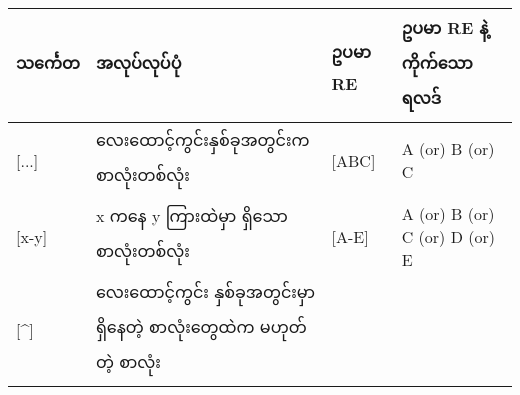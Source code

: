 \documentclass[11pt]{article}
\begin{document}
\begin{longtable}[c]{@{}llll@{}}
\toprule
\begin{minipage}[b]{0.12\columnwidth}\raggedright\strut
သင်္ကေတ
\strut\end{minipage} &
\begin{minipage}[b]{0.15\columnwidth}\raggedright\strut
အလုပ်လုပ်ပုံ
\strut\end{minipage} &
\begin{minipage}[b]{0.12\columnwidth}\raggedright\strut
ဥပမာ RE
\strut\end{minipage} &
\begin{minipage}[b]{0.10\columnwidth}\raggedright\strut
ဥပမာ RE နဲ့ ကိုက်သောရလဒ်
\strut\end{minipage}\tabularnewline
\midrule
\endhead
\begin{minipage}[t]{0.12\columnwidth}\raggedright\strut
{[}...{]}
\strut\end{minipage} &
\begin{minipage}[t]{0.15\columnwidth}\raggedright\strut
လေးထောင့်ကွင်းနှစ်ခုအတွင်းက စာလုံးတစ်လုံး
\strut\end{minipage} &
\begin{minipage}[t]{0.12\columnwidth}\raggedright\strut
{[}ABC{]}
\strut\end{minipage} &
\begin{minipage}[t]{0.10\columnwidth}\raggedright\strut
A (or) B (or) C
\strut\end{minipage}\tabularnewline
\begin{minipage}[t]{0.12\columnwidth}\raggedright\strut
{[}x-y{]}
\strut\end{minipage} &
\begin{minipage}[t]{0.15\columnwidth}\raggedright\strut
x ကနေ y ကြားထဲမှာ ရှိသော စာလုံးတစ်လုံး
\strut\end{minipage} &
\begin{minipage}[t]{0.12\columnwidth}\raggedright\strut
{[}A-E{]}
\strut\end{minipage} &
\begin{minipage}[t]{0.10\columnwidth}\raggedright\strut
A (or) B (or) C (or) D (or) E
\strut\end{minipage}\tabularnewline
\begin{minipage}[t]{0.12\columnwidth}\raggedright\strut
{[}\^{}{]}
\strut\end{minipage} &
\begin{minipage}[t]{0.15\columnwidth}\raggedright\strut
လေးထောင့်ကွင်း နှစ်ခုအတွင်းမှာ ရှိနေတဲ့ စာလုံးတွေထဲက မဟုတ်တဲ့ စာလုံး

\end{minipage}
\end{longtable}
\end{document}
